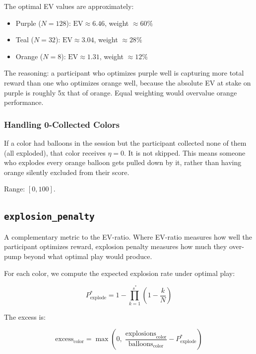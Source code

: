 \documentclass[11pt,a4paper]{article}
\begin{document}
The optimal EV values are approximately:
\begin{itemize}[nosep]
    \item \textcolor{purpleballoon}{Purple} ($N=128$): $\text{EV} \approx 6.46$, weight $\approx 60\%$
    \item \textcolor{tealballoon}{Teal} ($N=32$): $\text{EV} \approx 3.04$, weight $\approx 28\%$
    \item \textcolor{orangeballoon}{Orange} ($N=8$): $\text{EV} \approx 1.31$, weight $\approx 12\%$
\end{itemize}

The reasoning: a participant who optimizes purple well is capturing more
total reward than one who optimizes orange well, because the absolute EV
at stake on purple is roughly 5x that of orange. Equal weighting would
overvalue orange performance.

\subsubsection*{Handling 0-Collected Colors}

If a color had balloons in the session but the participant collected none
of them (all exploded), that color receives $\eta = 0$. It is not skipped.
This means someone who explodes every orange balloon gets pulled down by it,
rather than having orange silently excluded from their score.

Range: $[0, 100]$.


\subsection{\texttt{explosion\_penalty}}
\label{sec:explosion_penalty}

A complementary metric to the EV-ratio. Where EV-ratio measures
how well the participant optimizes reward, explosion penalty measures
how much they over-pump beyond what optimal play would produce.

For each color, we compute the expected explosion rate under optimal play:

\begin{equation}
    P_{\text{explode}}^{*} = 1 - \prod_{k=1}^{s^*}\left(1 - \frac{k}{N}\right)
\end{equation}

The excess is:

\begin{equation}
    \text{excess}_\text{color} = \max\!\left(0,\;
        \frac{\text{explosions}_\text{color}}{\text{balloons}_\text{color}}
        - P_{\text{explode}}^{*}\right)
\end{equation}
\end{document}
